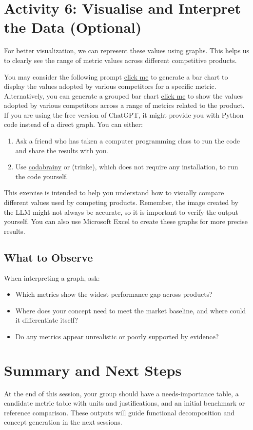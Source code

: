 \section{Activity 6: Visualise and Interpret the Data (Optional)}


For better visualization, we can represent these values using graphs. This helps us to clearly see the range of metric values across different competitive products. 

You may consider the following prompt \href{https://gist.github.com/balandongiv/3f06a6bdbf30c20dbcfd6877a46c8373}{click me} to generate a bar chart to display the values adopted by various competitors for a specific metric. Alternatively, you can generate a grouped bar chart \href{https://gist.github.com/balandongiv/dc9635a4feaf42694f8f5054b10f13cf}{click me} to show the values adopted by various competitors across a range of metrics related to the product.
If you are using the free version of ChatGPT, it might provide you with Python code instead of a direct graph. You can either:



\begin{enumerate}
    \item Ask a friend who has taken a computer programming class to run the code and share the results with you.
    \item Use  \href{https://www.codabrainy.com/en/python-compiler/}{codabrainy} or \href{https://trinket.io/embed/python3}{} (trinke), which does not require any installation, to run the code yourself.
\end{enumerate}

This exercise is intended to help you understand how to visually compare different values used by competing products. Remember, the image created by the LLM might not always be accurate, so it is important to verify the output yourself. You can also use Microsoft Excel to create these graphs for more precise results.

\subsection{What to Observe}

When interpreting a graph, ask:
\begin{itemize}
    \item Which metrics show the widest performance gap across products?
    \item Where does your concept need to meet the market baseline, and where could it differentiate itself?
    \item Do any metrics appear unrealistic or poorly supported by evidence?
\end{itemize}

\section{Summary and Next Steps}

At the end of this session, your group should have a needs-importance table, a candidate metric table with units and justifications, and an initial benchmark or reference comparison. These outputs will guide functional decomposition and concept generation in the next sessions.
